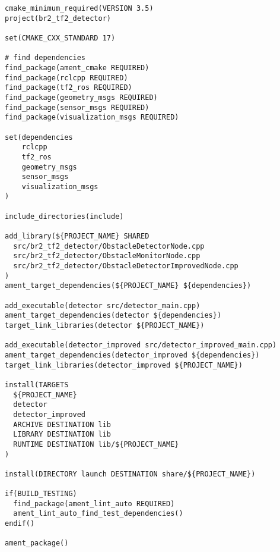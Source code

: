  \footnotesize
\begin{tcolorbox}[sharp corners, colframe=gray!80, colback=LightGray, left=0pt, top=0pt, bottom=0pt, title=\texttt{br2\_tf2\_detector/CMakeLists.txt}]
  \begin{verbatim}
cmake_minimum_required(VERSION 3.5)
project(br2_tf2_detector)

set(CMAKE_CXX_STANDARD 17)

# find dependencies
find_package(ament_cmake REQUIRED)
find_package(rclcpp REQUIRED)
find_package(tf2_ros REQUIRED)
find_package(geometry_msgs REQUIRED)
find_package(sensor_msgs REQUIRED)
find_package(visualization_msgs REQUIRED)

set(dependencies
    rclcpp
    tf2_ros
    geometry_msgs
    sensor_msgs
    visualization_msgs
)

include_directories(include)

add_library(${PROJECT_NAME} SHARED
  src/br2_tf2_detector/ObstacleDetectorNode.cpp
  src/br2_tf2_detector/ObstacleMonitorNode.cpp
  src/br2_tf2_detector/ObstacleDetectorImprovedNode.cpp
)
ament_target_dependencies(${PROJECT_NAME} ${dependencies})

add_executable(detector src/detector_main.cpp)
ament_target_dependencies(detector ${dependencies})
target_link_libraries(detector ${PROJECT_NAME})

add_executable(detector_improved src/detector_improved_main.cpp)
ament_target_dependencies(detector_improved ${dependencies})
target_link_libraries(detector_improved ${PROJECT_NAME})

install(TARGETS
  ${PROJECT_NAME}
  detector
  detector_improved
  ARCHIVE DESTINATION lib
  LIBRARY DESTINATION lib
  RUNTIME DESTINATION lib/${PROJECT_NAME}
)

install(DIRECTORY launch DESTINATION share/${PROJECT_NAME})

if(BUILD_TESTING)
  find_package(ament_lint_auto REQUIRED)
  ament_lint_auto_find_test_dependencies()
endif()

ament_package()
    \end{verbatim}
    \end{tcolorbox}
  \normalsize

